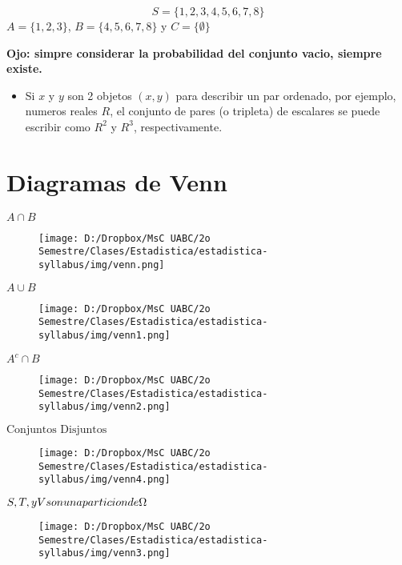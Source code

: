 \documentclass[]{book}
\providecommand{\tightlist}{%
  \setlength{\itemsep}{0pt}\setlength{\parskip}{0pt}}
\begin{document}
\[S = \{1,2,3,4,5,6,7,8\}\] \(A = \{1,2,3\}\), \(B = \{4,5,6,7,8\}\) y
\(C = \{\emptyset\}\)

 \textbf{Ojo: simpre considerar la probabilidad del conjunto vacio,
siempre existe.}

\begin{itemize}
\tightlist
\item
  Si \(x\) y \(y\) son 2 objetos \((x,y)\) para describir un par
  ordenado, por ejemplo, numeros reales \(R\), el conjunto de pares (o
  tripleta) de escalares se puede escribir como \(R^2\) y \(R^3\),
  respectivamente.
\end{itemize}

\section{Diagramas de Venn}\label{diagramas-de-venn}

 \(A \cap B\)

\begin{figure}[htbp]
\centering
\texttt{[image: D:/Dropbox/MsC UABC/2o Semestre/Clases/Estadistica/estadistica-syllabus/img/venn.png]}
\caption{}
\end{figure}

\(A\cup B\)

\begin{figure}[htbp]
\centering
\texttt{[image: D:/Dropbox/MsC UABC/2o Semestre/Clases/Estadistica/estadistica-syllabus/img/venn1.png]}
\caption{}
\end{figure}

\(A^c \cap B\)

\begin{figure}[htbp]
\centering
\texttt{[image: D:/Dropbox/MsC UABC/2o Semestre/Clases/Estadistica/estadistica-syllabus/img/venn2.png]}
\caption{}
\end{figure}

\(\text{Conjuntos Disjuntos}\)

\begin{figure}[htbp]
\centering
\texttt{[image: D:/Dropbox/MsC UABC/2o Semestre/Clases/Estadistica/estadistica-syllabus/img/venn4.png]}
\caption{}
\end{figure}

\(S,T,\space y \space V \space son \space una \space particion \space de \space \Omega\)

\begin{figure}[htbp]
\centering
\texttt{[image: D:/Dropbox/MsC UABC/2o Semestre/Clases/Estadistica/estadistica-syllabus/img/venn3.png]}
\caption{}
\end{figure}
\end{document}
